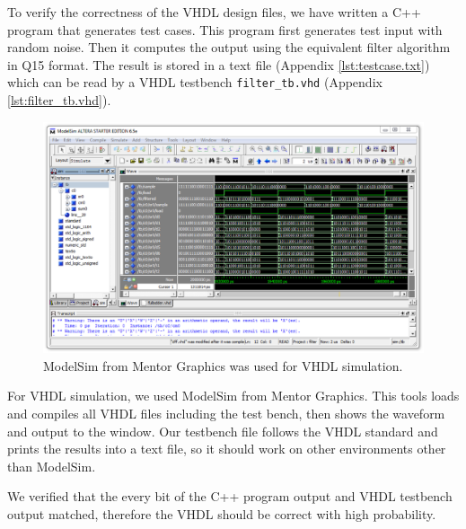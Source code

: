 To verify the correctness of the VHDL design files, we have written a C++ program that generates test cases. This program first generates test input with random noise. Then it computes the output using the equivalent filter algorithm in Q15 format. The result is stored in a text file (Appendix \ref{lst:testcase.txt}) which can be read by a VHDL testbench \texttt{filter\_tb.vhd} (Appendix \ref{lst:filter_tb.vhd}).

\begin{figure}[ht]
	\centering
	\includegraphics[width=6.5in]{images/modelsim}
	\caption{ModelSim from Mentor Graphics was used for VHDL simulation.}
	\label{fig:q7}
\end{figure}

For VHDL simulation, we used ModelSim from Mentor Graphics. This tools loads and compiles all VHDL files including the test bench, then shows the waveform and output to the window. Our testbench file follows the VHDL standard and prints the results into a text file, so it should work on other environments other than ModelSim.

We verified that the every bit of the C++ program output and VHDL testbench output matched, therefore the VHDL should be correct with high probability.